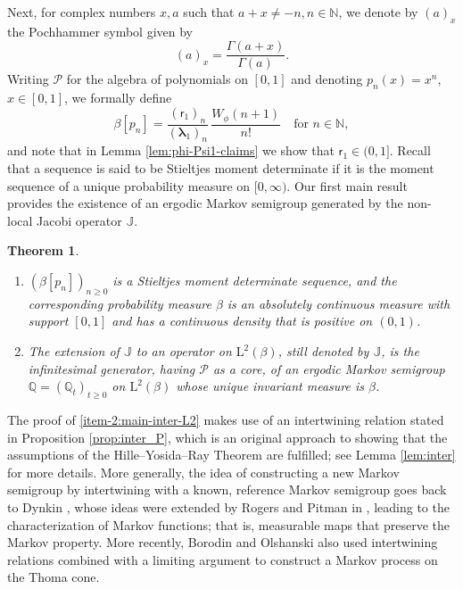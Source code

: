 \documentclass[JEP,XML,SOM,Unicode]{cedram}
\theoremstyle{plain}
\newtheorem{theorem}{Theorem}[section]
\theoremstyle{definition}
\newcommand{\N}{\mathbb{N}}
\newcommand{\Poly}{\mathscr{P}}
\newcommand{\J}{\mathds{Q}}
\newcommand{\calJ}{\mathds{J}}
\newcommand{\Leb}{\mathrm{L}}
\newcommand{\lam}{{\bm{\lambda}_1}}
\newcommand{\vat}{{\mathsf{r}_1}}
\let\bpsi\beta
\begin{document}
Next, for complex numbers $x,a$ such that $a+x\neq -n, n\in\N$, we denote by $(a)_x$ the Pochhammer symbol\vspace*{-3pt}
given by
\begin{equation}
\label{eq:defPoc}
(a)_x = \frac{\Gamma(a+x)}{\Gamma(a)}.
\end{equation}
Writing $\Poly$ for the algebra of polynomials on $[0,1]$ and denoting $p_n(x) = x^n$, $x \in [0,1]$,
we formally define\vspace*{-3pt}
\begin{equation}
\label{eq:mom-bpn}
\bpsi[p_n] = \frac{(\vat)_n}{(\lam)_n}\,\frac{W_{\phi}(n+1)}{n!} \quad \mbox{for } n \in \N,
\end{equation}
and note that in Lemma \ref{lem:phi-Psi1-claims} we show that $\vat \in (0,1]$. Recall that a sequence is said to be Stieltjes moment determinate if it is the moment sequence of a unique probability measure on $[0,\infty)$. Our first main result provides the existence of an ergodic Markov semigroup generated by the non-local Jacobi operator $\calJ$.

\skpt
\begin{theorem} \label{thm:main-inter-L2}
\begin{enumerate}
\item \label{item-1:main-inter-L2}
$(\bpsi [ p_n ])_{n \geq 0}$ is a Stieltjes moment determinate sequence, and the corresponding probability measure $\bpsi$ is an absolutely continuous
measure with support $[0,1]$ and has a continuous density that is positive on $(0,1)$.
\item \label{item-2:main-inter-L2} The extension of $\calJ$ to an operator on $\Leb^2(\bpsi)$, still denoted by $\calJ$, is the infinitesimal generator, having $\Poly$ as a core, of an ergodic Markov semigroup $\J = (\J_t)_{t \geq 0}$ on $\Leb^2(\bpsi)$ whose unique invariant measure is $\bpsi$.
\end{enumerate}
\end{theorem}

The proof of \eqref{item-2:main-inter-L2} makes use of an intertwining relation stated in Proposition \ref{prop:inter_P}, which is an original approach to showing that the assumptions of the Hille--Yosida--Ray Theorem are fulfilled; see Lemma \ref{lem:inter} for more details. More generally, the idea of constructing a new Markov semigroup by intertwining with a known, reference Markov semigroup goes back to Dynkin \cite{dynkin:1965}, whose ideas were extended by Rogers and Pitman in \cite{rogers:1981},
leading to the characterization of Markov functions; that is, measurable maps that preserve the Markov property. More recently, Borodin and Olshanski \cite{thoma-cone} also used intertwining relations combined with a limiting argument to construct a Markov process on the Thoma cone.
\end{document}
